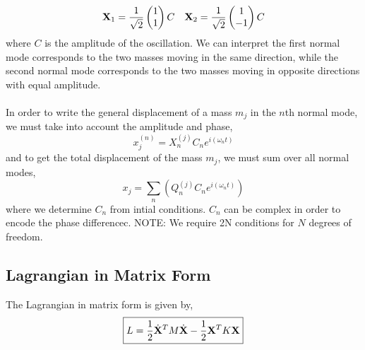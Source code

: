 \documentclass{book}
\begin{document}
\begin{align}
	\vb{X}_1 = \frac{1}{\sqrt{2}}\begin{pmatrix}
		1 \\ 1
	\end{pmatrix}C && \vb{X}_2 = \frac{1}{\sqrt{2}}\begin{pmatrix}
	1 \\ -1
	\end{pmatrix}C
\end{align}
where $C$ is the amplitude of the oscillation. We can interpret the first normal mode corresponds to the two masses moving in the same direction, while the second normal mode corresponds to the two masses moving in opposite directions with equal amplitude.
\\\\
In order to write the general displacement of a mass $m_j$ in the $n$th normal mode, we must take into account the amplitude and phase,
\begin{equation}
	x_j^{(n)} = X_n^{(j)}C_ne^{i(\omega_n t)}
\end{equation}
and to get the total displacement of the mass $m_j$, we must sum over all normal modes,
\begin{equation}
	x_j = \sum_n\left(Q_n^{(j)} C_ne^{i(\omega_nt)}\right)
\end{equation}
where we determine $C_n$ from intial conditions. $C_n$ can be complex in order to encode the phase differencec. NOTE: We require 2N conditions for $N$ degrees of freedom.
\subsection{Lagrangian in Matrix Form}
The Lagrangian in matrix form is given by,
\begin{equation}
	\boxed{L = \frac{1}{2}\Dot{\vb{X}}^TM\Dot{\vb{X}} - \frac{1}{2}\vb{X}^TK\vb{X}}
\end{equation}
\end{document}
